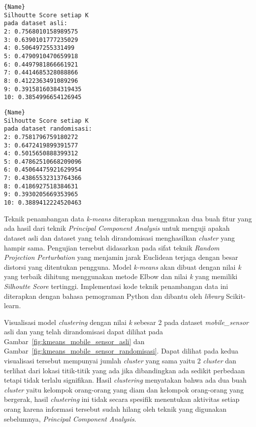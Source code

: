 \noindent\begin{minipage}{.46\textwidth}
\begin{lstlisting}[caption=Silhoutte Score Asli,frame=tlrb, label=mobile_sensor_siluet_asli]{Name}
Silhoutte Score setiap K
pada dataset asli: 
2: 0.7568010158989575
3: 0.6390101777235029
4: 0.506497255331499
5: 0.4790910470659918
6: 0.4497981866661921
7: 0.4414685328088866
8: 0.4122363491089296
9: 0.39158160384319435
10: 0.3854996654126945
\end{lstlisting}
\end{minipage}\hfill
\begin{minipage}{.46\textwidth}
\begin{lstlisting}[caption=Silhoutte Score Randomisasi,frame=tlrb, label=mobile_sensor_siluet_randomisasi]{Name}
Silhoutte Score setiap K
pada dataset randomisasi: 
2: 0.7581796759180272
3: 0.6472419899391577
4: 0.5015650888399312
5: 0.47862510668209096
6: 0.45064475921629954
7: 0.43865532313764366
8: 0.4186927518384631
9: 0.3930205669353965
10: 0.3889412224520463
\end{lstlisting}
\end{minipage}

Teknik penambangan data \textit{k-means} diterapkan menggunakan dua buah fitur yang ada hasil dari teknik \textit{Principal Component Analysis} untuk menguji apakah dataset asli dan dataset yang telah dirandomisasi menghasilkan \textit{cluster} yang hampir sama. Pengujian tersebut didasarkan pada sifat teknik \textit{Random Projection Perturbation} yang menjamin jarak Euclidean terjaga dengan besar distorsi yang ditentukan pengguna. Model \textit{k-means} akan dibuat dengan nilai \textit{k} yang terbaik dihitung menggunakan metode Elbow dan nilai \textit{k} yang memiliki \textit{Silhoutte Score} tertinggi. Implementasi kode teknik penambangan data ini diterapkan dengan bahasa pemograman Python dan dibantu oleh \textit{library} Scikit-learn. 

Visualisasi model \textit{clustering} dengan nilai \textit{k} sebesar 2 pada dataset \textit{mobile\_sensor} asli dan yang telah dirandomisasi dapat dilihat pada Gambar~\ref{fig:kmeans_mobile_sensor_asli} dan Gambar~\ref{fig:kmeans_mobile_sensor_randomisasi}. Dapat dilihat pada kedua visualisasi tersebut mempunyai jumlah \textit{cluster} yang sama yaitu 2 \textit{cluster} dan terlihat dari lokasi titik-titik yang ada jika dibandingkan ada sedikit perbedaan tetapi tidak terlalu signifikan. Hasil \textit{clustering} menyatakan bahwa ada dua buah \textit{cluster} yaitu kelompok orang-orang yang diam dan kelompok orang-orang yang bergerak, hasil \textit{clustering} ini tidak secara spesifik menentukan aktivitas setiap orang karena informasi tersebut sudah hilang oleh teknik yang digunakan sebelumnya, \textit{Principal Component Analysis}. 
	
